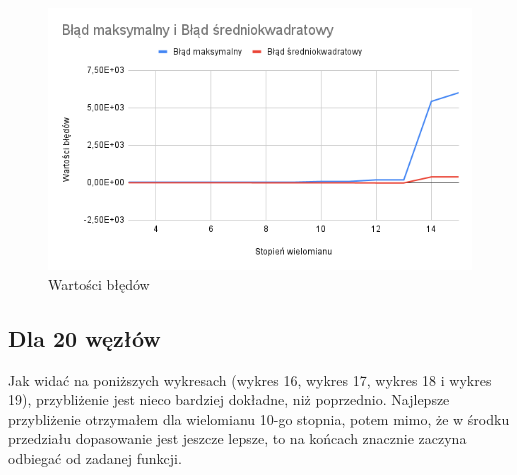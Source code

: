 \documentclass{article}
\begin{document}
\begin{figure}[H]
  \centering
  \begin{minipage}[b]{0.4\textwidth}
    \includegraphics[width=\textwidth]{img15.png}
    \caption{Wartości błędów}
  \end{minipage}
\end{figure}

\newpage

\subsection{Dla 20 węzłów}

Jak widać na poniższych wykresach (wykres 16, wykres 17, wykres 18 i wykres 19), przybliżenie jest nieco bardziej dokładne, niż poprzednio. Najlepsze przybliżenie otrzymałem dla wielomianu 10-go stopnia, potem mimo, że w środku przedziału dopasowanie jest jeszcze lepsze, to na końcach znacznie zaczyna odbiegać od zadanej funkcji.
\end{document}
